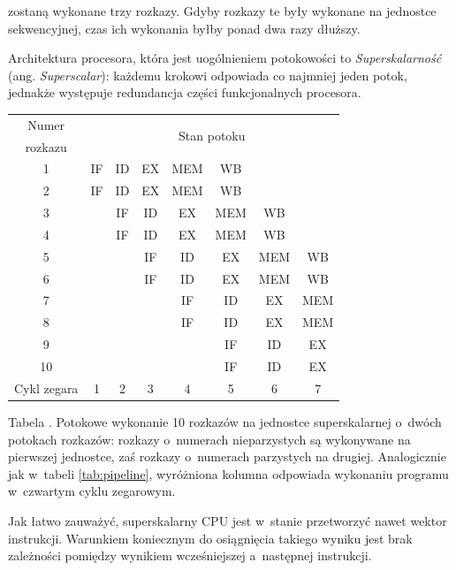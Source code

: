 \documentclass[12pt,makeidx]{mwart}
\newcounter{tabmain}
\newcommand{\mytabcaption}[1]{ \begin{center}Tabela \arabic{tabmain}. #1.\end{center} \addtocounter{tabmain}{1} }
\begin{document}
	zostaną wykonane trzy rozkazy. Gdyby rozkazy te były wykonane na jednostce sekwencyjnej, czas ich wykonania byłby ponad dwa razy dłuższy.
\par
%
\indent
	Architektura procesora, która jest uogólnieniem potokowości to \emph{Superskalarność} (ang. \emph{Superscalar}): 
	każdemu krokowi odpowiada co najmniej jeden potok, jednakże występuje redundancja części funkcjonalnych procesora.
	\begin{center}
	\centering
	\begin{tabular}{|c|c|c|c|c|c|c|c|} \hline
	Numer 		 & \multicolumn{7}{c|}{\multirow{2}{*}{Stan potoku}} \\
	rozkazu & \multicolumn{7}{c|}{} \\ \hline
	1 & IF & ID & EX & \cellcolor{yellow} MEM & WB & & \\ \hline
	2 & IF & ID & EX & \cellcolor{yellow} MEM & WB & & \\ \hline
	3 & & IF & ID & \cellcolor{yellow} EX & MEM & WB & \\ \hline
	4 & & IF & ID & \cellcolor{yellow} EX & MEM & WB & \\ \hline
	5 & & & IF & \cellcolor{yellow} ID & EX & MEM & WB \\ \hline
	6 & & & IF & \cellcolor{yellow} ID & EX & MEM & WB \\ \hline
	7 & & & & \cellcolor{yellow} IF & ID & EX & MEM \\ \hline
	8 & & & & \cellcolor{yellow} IF & ID & EX & MEM \\ \hline
	9 & & & & \cellcolor{yellow} & IF & ID & EX \\ \hline
	10 & & & & \cellcolor{yellow} & IF & ID & EX \\ \hline \hline
	Cykl zegara & 1 & 2 & 3 & \cellcolor{yellow} 4 & 5 & 6 & 7 \\ \hline
	\end{tabular}
	\mytabcaption{Potokowe wykonanie 10 rozkazów na jednostce superskalarnej o~dwóch potokach rozkazów: rozkazy o~numerach nieparzystych są wykonywane na 
					pierwszej jednostce, zaś rozkazy o~numerach parzystych na drugiej. Analogicznie jak w~tabeli \ref{tab:pipeline}, wyróżniona
					kolumna odpowiada wykonaniu programu w~czwartym cyklu zegarowym}
	\end{center}
	Jak łatwo zauważyć, superskalarny CPU jest w~stanie przetworzyć nawet wektor instrukcji. Warunkiem koniecznym do osiągnięcia takiego
	wyniku jest brak zależności pomiędzy wynikiem wcześniejszej a~następnej instrukcji.
\par
\end{document}
